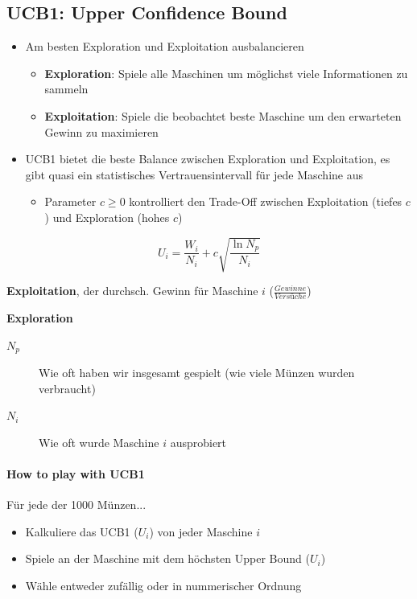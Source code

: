 \documentclass[a4paper]{article}
\begin{document}
		\subsection{UCB1: Upper Confidence Bound}
		
		\begin{itemize}
			\item Am besten Exploration und Exploitation ausbalancieren
				\begin{itemize}
					\item \textbf{Exploration}: Spiele alle Maschinen um möglichst viele Informationen zu sammeln
					\item \textbf{Exploitation}: Spiele die beobachtet beste Maschine um den erwarteten Gewinn zu maximieren
				\end{itemize}
			\item UCB1 bietet die beste Balance zwischen Exploration und Exploitation, es gibt quasi ein statistisches Vertrauensintervall für jede Maschine aus
				\begin{itemize}
					\item Parameter $c \geq 0$ kontrolliert den Trade-Off zwischen Exploitation (tiefes $c$) und Exploration (hohes $c$)
				\end{itemize}
		\end{itemize}
	
		$$U_{i} = \frac{W_{i}}{N_{i}} + c \sqrt{\frac{\ln N_{p}}{N_{i}}}$$
		
		\vspace{1em}
		\begin{description}
			\item[$\frac{W_{i}}{N_{i}}$] \textbf{Exploitation}, der durchsch. Gewinn für Maschine $i$ ($\frac{Gewinne}{Versüche}$)
			\item
			\item[$\sqrt{\frac{\ln N_{p}}{N_{i}}}$] \textbf{Exploration}
				\begin{description}
					\item[$N_{p}$] Wie oft haben wir insgesamt gespielt (wie viele Münzen wurden verbraucht)
					\item[$N_{i}$] Wie oft wurde Maschine $i$ ausprobiert
				\end{description}
		\end{description}
		
		\newpage
		
		\paragraph{How to play with UCB1}
		Für jede der 1000 Münzen...
		\begin{itemize}
			\item Kalkuliere das UCB1 ($U_{i}$) von jeder Maschine $i$
			\item Spiele an der Maschine mit dem höchsten Upper Bound ($U_{i}$)
			\item Wähle entweder zufällig oder in nummerischer Ordnung
		\end{itemize}
		
\end{document}
